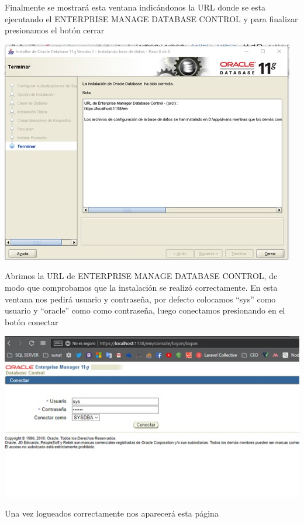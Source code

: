 \begin{flushleft}
Finalmente se mostrará esta ventana indicándonos la URL donde se esta ejecutando el ENTERPRISE MANAGE DATABASE CONTROL y para finalizar presionamos el botón cerrar\\
\begin{center}
\includegraphics{images/image-15}\\
\end{center}
Abrimos la URL de ENTERPRISE MANAGE DATABASE CONTROL, de modo que comprobamos que la instalación se realizó correctamente. En esta ventana nos pedirá usuario y contraseña, por defecto colocamos “sys” como usuario y “oracle” como como contraseña, luego conectamos presionando en el botón conectar\\
\begin{center}
\includegraphics{images/image-16}\\
\end{center}
Una vez logueados correctamente nos aparecerá esta página\\

\end{flushleft}
